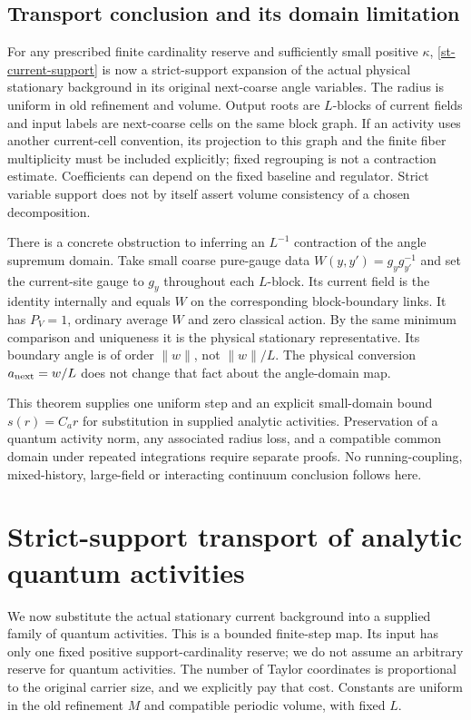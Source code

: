 \documentclass[11pt]{article}
\theoremstyle{remark}
\begin{document}
\subsection{Transport conclusion and its domain limitation}
\label{st-scope-section}

For any prescribed finite cardinality reserve and sufficiently small
positive $\kappa$, \eqref{st-current-support} is now a strict-support
expansion of the actual physical stationary background in its original
next-coarse angle variables. The radius is uniform in old refinement
and volume. Output roots are $L$-blocks of current fields and input
labels are next-coarse cells on the same block graph. If an activity
uses another current-cell convention, its projection to this graph and
the finite fiber multiplicity must be included explicitly; fixed
regrouping is not a contraction estimate. Coefficients can depend on
the fixed baseline and regulator. Strict variable support does not by
itself assert volume consistency of a chosen decomposition.

There is a concrete obstruction to inferring an $L^{-1}$ contraction
of the angle supremum domain. Take small coarse pure-gauge data
$W(y,y')=g_yg_{y'}^{-1}$ and set the current-site gauge to $g_y$
throughout each $L$-block. Its current field is the identity internally
and equals $W$ on the corresponding block-boundary links. It has
$P_V=1$, ordinary average $W$ and zero classical action. By the same
minimum comparison and uniqueness it is the physical stationary
representative. Its boundary angle is of order $\|w\|$, not
$\|w\|/L$. The physical conversion $a_{\rm next}=w/L$ does not change
that fact about the angle-domain map.

This theorem supplies one uniform step and an explicit small-domain
bound $s(r)=C_ar$ for substitution in supplied analytic activities.
Preservation of a quantum activity norm, any associated radius loss,
and a compatible common domain under repeated integrations require
separate proofs. No running-coupling, mixed-history, large-field or
interacting continuum conclusion follows here.

\section{Strict-support transport of analytic quantum activities}
\label{qt-section}

We now substitute the actual stationary current background into a
supplied family of quantum activities. This is a bounded finite-step
map. Its input has only one fixed positive support-cardinality reserve;
we do not assume an arbitrary reserve for quantum activities. The
number of Taylor coordinates is proportional to the original carrier
size, and we explicitly pay that cost. Constants are uniform in the
old refinement $M$ and compatible periodic volume, with fixed $L$.
\end{document}
